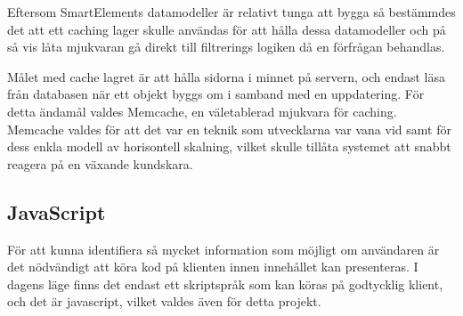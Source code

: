 Eftersom SmartElements datamodeller är relativt tunga att bygga så bestämmdes det att ett caching lager skulle användas för att hålla dessa datamodeller och på så vis låta mjukvaran gå direkt till filtrerings logiken då en förfrågan behandlas.

Målet med cache lagret är att hålla sidorna i minnet på servern, och endast läsa från databasen när ett objekt byggs om i samband med en uppdatering. För detta ändamål valdes Memcache, en väletablerad mjukvara för caching. Memcache valdes för att det var en teknik som utvecklarna var vana vid samt för dess enkla modell av horisontell skalning, vilket skulle tillåta systemet att snabbt reagera på en växande kundskara.

\subsection{JavaScript}

För att kunna identifiera så mycket information som möjligt om användaren är det nödvändigt att köra kod på klienten innen innehållet kan presenteras. I dagens läge finns det endast ett skriptspråk som kan köras på godtycklig klient, och det är javascript, vilket valdes även för detta projekt. 

